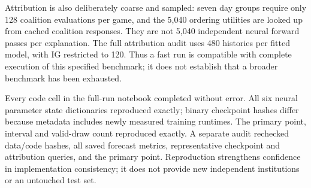 \documentclass[conference]{IEEEtran}
\begin{document}
Attribution is also deliberately coarse and sampled: seven day groups require only 128 coalition evaluations per game, and the 5,040 ordering utilities are looked up from cached coalition responses. They are not 5,040 independent neural forward passes per explanation. The full attribution audit uses 480 histories per fitted model, with IG restricted to 120. Thus a fast run is compatible with complete execution of this specified benchmark; it does not establish that a broader benchmark has been exhausted.

Every code cell in the full-run notebook completed without error. All six neural parameter state dictionaries reproduced exactly; binary checkpoint hashes differ because metadata includes newly measured training runtimes. The primary point, interval and valid-draw count reproduced exactly. A separate audit rechecked data/code hashes, all saved forecast metrics, representative checkpoint and attribution queries, and the primary point. Reproduction strengthens confidence in implementation consistency; it does not provide new independent institutions or an untouched test set.
\end{document}
